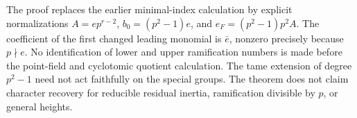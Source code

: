 \begin{remark}
\label{rem:B-RD67-scope}
The proof replaces the earlier minimal-index calculation by explicit
normalizations \(A=e p^{r-2}\), \(b_0=(p^2-1)e\), and
\(e_F=(p^2-1)p^2A\). The coefficient of the first changed leading
monomial is \(\bar e\), nonzero precisely because \(p\nmid e\).
No identification of lower and upper ramification numbers is made
before the point-field and cyclotomic quotient calculation.
The tame extension of degree \(p^2-1\) need not act faithfully on
the special groups. The theorem does not claim character recovery
for reducible residual inertia, ramification divisible by \(p\),
or general heights.
\end{remark}
